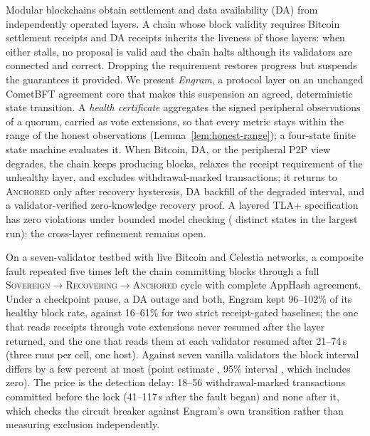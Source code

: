 Modular blockchains obtain settlement and data availability (DA) from
independently operated layers. A chain whose block validity requires Bitcoin
settlement receipts and DA receipts inherits the liveness of those layers: when
either stalls, no proposal is valid and the chain halts although its validators
are connected and correct. Dropping the requirement restores progress but
suspends the guarantees it provided. We present \emph{Engram}, a protocol layer
on an unchanged CometBFT agreement core that makes this suspension an agreed,
deterministic state transition. A \emph{health certificate} aggregates the
signed peripheral observations of a quorum, carried as vote extensions, so that
every metric stays within the range of the honest observations
(Lemma~\ref{lem:honest-range}); a four-state finite state machine evaluates it.
When Bitcoin, DA, or the peripheral P2P view degrades, the chain keeps producing
blocks, relaxes the receipt requirement of the unhealthy layer, and excludes
withdrawal-marked transactions; it returns to \textsc{Anchored} only after
recovery hysteresis, DA backfill of the degraded interval, and a
validator-verified zero-knowledge recovery proof. A layered TLA+ specification
has zero violations under bounded model checking (\resFSMStatesM{} distinct
states in the largest run); the cross-layer refinement remains open.

On a seven-validator testbed with live Bitcoin and Celestia networks, a composite
fault repeated five times left the chain committing blocks through a full
\textsc{Sovereign}$\to$\textsc{Recovering}$\to$\textsc{Anchored} cycle with
complete AppHash agreement. Under a checkpoint pause, a DA outage and both,
Engram kept 96--102\% of its healthy block rate, against 16--61\% for two strict
receipt-gated baselines; the one that reads receipts through vote extensions
never resumed after the layer returned, and the one that reads them at each
validator resumed after 21--74\,s (three runs per cell, one host). Against seven
vanilla validators the block interval differs by a few percent at most (point
estimate \resOverheadPct{}, 95\% interval \resOverheadCI{}, which includes zero).
The price is the detection delay: 18--56 withdrawal-marked transactions committed
before the lock (41--117\,s after the fault began) and none after it, which
checks the circuit breaker against Engram's own transition rather than
measuring exclusion independently.
